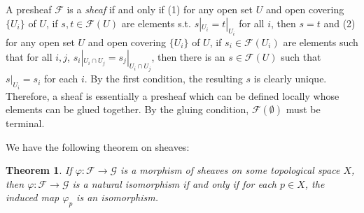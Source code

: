 \documentclass[12pt]{article}
\newtheorem{theorem}{Theorem}[subsection]
\theoremstyle{remark}
\begin{document}
    A presheaf $\mathscr F$ is a \textit{sheaf} if and only if (1) for any open set $U$ and open covering $\{U_i\}$ of $U$, if $s, t\in\mathscr F(U)$ are elements s.t. $s|_{U_i}=t|_{U_i}$ for all $i$, then $s=t$ and (2) for any open set $U$ and open covering $\{U_i\}$ of $U$, if $s_i\in\mathscr F(U_i)$ are elements such that for all $i, j$, $s_i|_{U_i\cap U_j}=s_j|_{U_i\cap U_j}$, then there is an $s\in\mathscr F(U)$ such that $s|_{U_i}=s_i$ for each $i$. By the first condition, the resulting $s$ is clearly unique. Therefore, a sheaf is essentially a presheaf which can be defined locally whose elements can be glued together. By the gluing condition, $\mathscr F(\emptyset)$ must be terminal.

	We have the following theorem on sheaves:
	\begin{theorem}\label{t111}
	If $\varphi:\mathscr F\to\mathscr G$ is a morphism of sheaves on some topological space $X$, then $\varphi:\mathscr F\to\mathscr G$ is a natural isomorphism if and only if for each $p\in X$, the induced map $\varphi_p$ is an isomorphism.
	\end{theorem}
\end{document}
